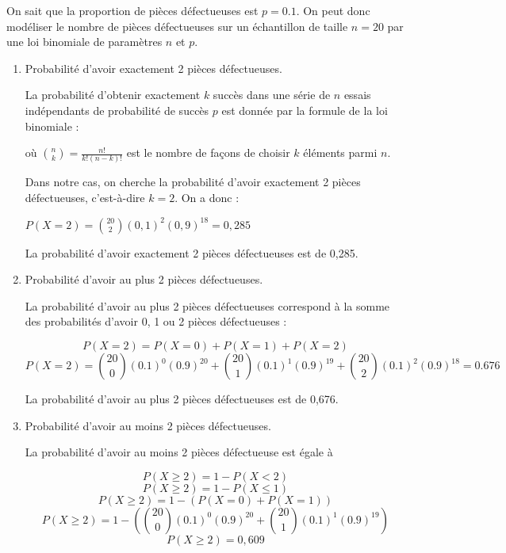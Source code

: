 \documentclass[french]{book}
\begin{document}
\begin{corrige}
On sait que la proportion de pièces défectueuses est $p=0.1$. On peut donc modéliser le nombre de pièces défectueuses sur un échantillon de taille $n=20$ par une loi binomiale de paramètres $n$ et $p$.

\begin{enumerate}
\item Probabilité d'avoir exactement 2 pièces défectueuses.

La probabilité d'obtenir exactement $k$ succès dans une série de $n$ essais indépendants de probabilité de succès $p$ est donnée par la formule de la loi binomiale :


où $\binom{n}{k}=\frac{n!}{k!(n-k)!}$ est le nombre de façons de choisir $k$ éléments parmi $n$.

Dans notre cas, on cherche la probabilité d'avoir exactement 2 pièces défectueuses, c'est-à-dire $k=2$. On a donc :

$P(X=2)=\binom{20}{2}(0,1)^2(0,9)^{18}=0,285$

La probabilité d'avoir exactement 2 pièces défectueuses est de 0,285.

\item Probabilité d'avoir au plus 2 pièces défectueuses.

La probabilité d'avoir au plus 2 pièces défectueuses correspond à la somme des probabilités d'avoir 0, 1 ou 2 pièces défectueuses :

$$P(X=2) = P(X=0)+P(X=1)+P(X=2)$$
$$P(X=2) =\binom{20}{0}(0.1)^0(0.9)^{20}+\binom{20}{1}(0.1)^1(0.9)^{19}+\binom{20}{2}(0.1)^2(0.9)^{18}= 0.676$$

La probabilité d'avoir au plus 2 pièces défectueuses est de 0,676.

\item Probabilité d'avoir au moins 2 pièces défectueuses.

La probabilité d'avoir au moins 2 pièces défectueuse est égale à

$$P(X\geq 2) = 1-P(X<2) $$
$$P(X\geq 2)=1-P(X\leq 1)$$ 
$$P(X\geq 2)= 1-(P(X=0)+P(X=1)) $$
$$P(X\geq 2)= 1-(\binom{20}{0}(0.1)^0(0.9)^{20}+\binom{20}{1}(0.1)^1(0.9)^{19})$$
$$P(X\geq 2)=0,609$$
\end{enumerate}
\end{corrige}
\end{document}
